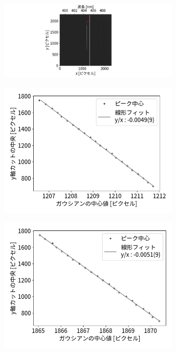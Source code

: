 \documentclass[a4paper,11pt,uplatex]{jsbook}
\begin{document}
\begin{figure}[H]
  \centering
  \begin{subfigure}[h]{\linewidth}
    \centering
    \includegraphics[width=\linewidth]{image/4-tilt.png}
  \end{subfigure}
  \hfill
  \vspace{1em}
  \begin{subfigure}[h]{0.45\linewidth}
    \centering
    \includegraphics[width=\linewidth]{image/4-tiltfpeak.png}
  \end{subfigure}
  \hfill
  \begin{subfigure}[h]{0.45\linewidth}
    \centering
    \includegraphics[width=\linewidth]{image/4-tiltspeak.png}

\end{subfigure}
\end{figure}
\end{document}
